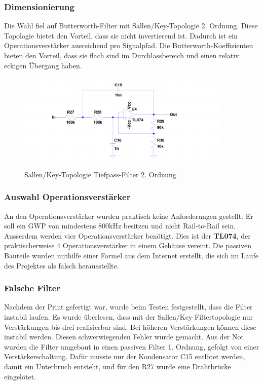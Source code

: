 \subsubsection*{Dimensionierung}

Die Wahl fiel auf Butterworth-Filter mit Sallen/Key-Topologie 2. Ordnung. Diese Topologie bietet den Vorteil, dass sie nicht invertierend ist. Dadurch ist ein Operationsverstärker ausreichend pro Signalpfad. Die Butterworth-Koeffizienten bieten den Vorteil, dass sie flach sind im Durchlassbereich und einen relativ eckigen Übergang haben.\cite{wiki}



\begin{figure}[H]
\begin{center}
\includegraphics[width=0.9\textwidth]{images/Analoge_Schaltung_Sallen.png}
\caption{Sallen/Key-Topologie Tiefpass-Filter 2. Ordnung}
\end{center}
\end{figure}


\subsubsection*{Auswahl Operationsverstärker}
An den Operationsverstärker wurden praktisch keine Anforderungen gestellt. Er soll ein GWP\cite{wiki} von mindestens 800kHz besitzen und nicht Rail-to-Rail sein. Ausserdem werden vier Operationsverstärker benötigt. Dies ist der \textbf{TL074}, der praktischerweise 4 Operationsverstärker in einem Gehäuse vereint. Die passiven Bauteile wurden mithilfe einer Formel\cite{fail} aus dem Internet erstellt, die sich im Laufe des Projektes als falsch herausstellte.

\subsubsection*{Falsche Filter}
Nachdem der Print gefertigt war, wurde beim Testen festgestellt, dass die Filter instabil laufen. Es wurde überlesen, dass mit der Sallen/Key-Filtertopologie nur Verstärkungen bis drei realisierbar sind. Bei höheren Verstärkungen können diese instabil werden. Diesen schwerwiegenden Fehler wurde gemacht. Aus der Not wurden die Filter umgebaut in einen passiven Filter 1. Ordnung, gefolgt von einer Verstärkerschaltung. Dafür musste nur der Kondensator C15 entlötet werden, damit ein Unterbruch entsteht, und für den R27 wurde eine Drahtbrücke eingelötet.

